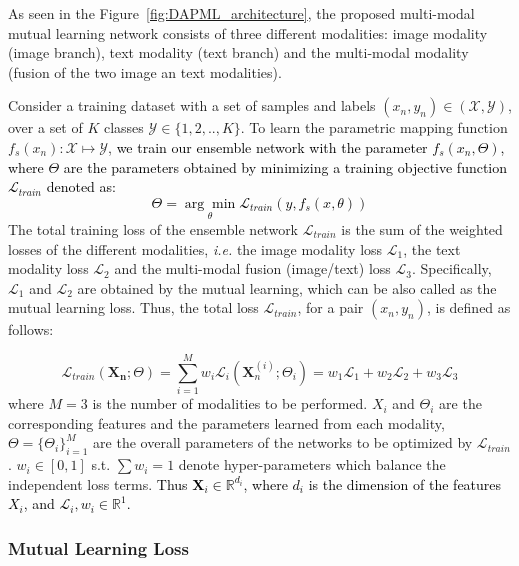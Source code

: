 \documentclass[twocolumn]{svjour3}
\newcommand{\ie}{\textit{i.e. }}
\begin{document}
As seen in the Figure~\ref{fig:DAPML_architecture}, the proposed multi-modal mutual learning network consists of three different modalities: image modality (image branch), text modality (text branch) and the multi-modal modality (fusion of the two image an text modalities). 

Consider a training dataset with a set of samples and labels $(x_n, y_n) \in (\mathcal{X}, \mathcal{Y})$, over a set of $K$ classes $\mathcal{Y} \in \{1,2,..,K\}$. To learn the parametric mapping function $f_s(x_n) : \mathcal{X} \mapsto \mathcal{Y}$, \textcolor{black}{we train our ensemble network with the parameter $f_s(x_n, {\Theta})$, where ${\Theta}$ are the parameters obtained by minimizing a training objective function $\mathcal{L}_{train}$ denoted as: 
\begin{equation}
{\Theta} = \underset{\theta}{\arg\min} \mathcal{L}_{train}(y, f_s(x, {\theta}))
\label{eq:equation10}
\end{equation}
}
The total training loss of the ensemble network $\mathcal{L}_{train}$ is the sum of the weighted losses of the different modalities, \ie the image modality loss $\mathcal{L}_1$, the text modality loss $\mathcal{L}_2$ and the multi-modal fusion (image/text) loss $\mathcal{L}_3$. Specifically, $\mathcal{L}_1$ and $\mathcal{L}_2$ are obtained by the mutual learning, which can be also called as the mutual learning loss. Thus, the total loss $\mathcal{L}_{train}$, for a pair $(x_n,y_n)$, is defined as follows:



\begin{equation}
\mathcal{L}_{train}(\mathbf{X_n};\Theta) = \sum_{i=1}^{M}w_i\mathcal{L}_i(\mathbf{X}_n^{(i)};\Theta_i) = w_1\mathcal{L}_1 + w_2\mathcal{L}_2 +w_3\mathcal{L}_3  
\label{eq:equation11}
\end{equation}
where $M = 3$ is the number of modalities to be performed. ${X_i}$ and ${\Theta_i}$ are the corresponding features and the parameters learned from each modality, $\Theta=\{\Theta_i\}_{i=1}^{M}$ are the overall parameters of the networks to be optimized by $\mathcal{L}_{train}$. $w_i \in[0,1]$ s.t. $\sum w_i=1$ denote hyper-parameters which balance the independent loss terms. \textcolor{black}{Thus $\mathbf{X}_i \in \mathbb{R}^{d_i}$, where $d_i$ is the dimension of the features $X_i$, and $\mathcal{L}_i, w_i \in \mathbb{R}^1$.}

\subsubsection{Mutual Learning Loss}
\end{document}
